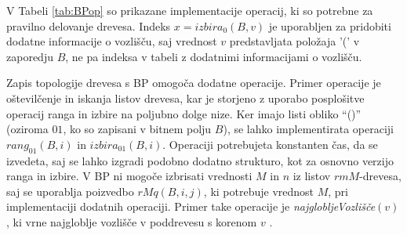 V Tabeli \ref{tab:BPop} so prikazane implementacije operacij, ki so potrebne za pravilno delovanje drevesa. Indeks $x=izbira_0(B,v)$ je uporabljen za pridobiti dodatne informacije o vozlišču, saj vrednost $v$ predstavljata položaja '(' v zaporedju $B$, ne pa indeksa v tabeli z dodatnimi informacijami o vozlišču.

Zapis topologije drevesa s BP omogoča dodatne operacije. Primer operacije je oštevilčenje in iskanja listov drevesa, kar je storjeno z uporabo posplošitve operacij ranga in izbire na poljubno dolge nize. Ker imajo listi obliko \enquote{()} (oziroma $01$, ko so zapisani v bitnem polju $B$), se lahko implementirata operaciji $rang_{01}(B,i)$ in $izbira_{01}(B,i)$. Operaciji potrebujeta konstanten čas, da se izvedeta, saj se lahko izgradi podobno dodatno strukturo, kot za osnovno verzijo ranga in izbire. V BP ni mogoče izbrisati vrednosti $M$ in $n$ iz listov $rmM$-drevesa, saj se uporablja poizvedbo $rMq(B,i,j)$, ki potrebuje vrednost $M$, pri implementaciji dodatnih operaciji. Primer take operacije je \textit{najglobljeVozlišče}$(v)$, ki vrne najgloblje vozlišče v poddrevesu s korenom $v$ \cite{Navarro2016}.
